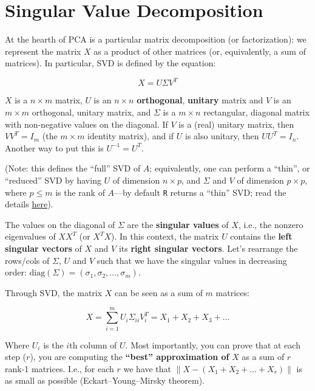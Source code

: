 \documentclass[
  letterpaper,
  DIV=11,
  numbers=noendperiod]{scrreprt}
\begin{document}
\hypertarget{singular-value-decomposition}{%
\section{Singular Value
Decomposition}\label{singular-value-decomposition}}

At the hearth of PCA is a particular matrix decomposition (or
factorization): we represent the matrix \(X\) as a product of other
matrices (or, equivalently, a sum of matrices). In particular, SVD is
defined by the equation:

\[
X = U \Sigma V^T
\]

\(X\) is a \(n \times m\) matrix, \(U\) is an \(n \times n\)
\textbf{orthogonal}, \textbf{unitary} matrix and \(V\) is an
\(m \times m\) orthogonal, unitary matrix, and \(\Sigma\) is a
\(m \times n\) rectangular, diagonal matrix with non-negative values on
the diagonal. If \(V\) is a (real) unitary matrix, then \(VV^T = I_m\)
(the \(m \times m\) identity matrix), and if \(U\) is also unitary, then
\(UU^T = I_n\). Another way to put this is \(U^{-1} = U^T\).

(Note: this defines the ``full'' SVD of \(A\); equivalently, one can
perform a ``thin'', or ``reduced'' SVD by having \(U\) of dimension
\(n \times p\), and \(\Sigma\) and \(V\) of dimension \(p \times p\),
where \(p \leq m\) is the rank of \(A\)---by default \texttt{R} returns
a ``thin'' SVD; read the details
\href{http://www.seas.ucla.edu/~vandenbe/133B/lectures/svd.pdf}{here}).

The values on the diagonal of \(\Sigma\) are the \textbf{singular
values} of \(X\), i.e., the nonzero eigenvalues of \(XX^T\) (or
\(X^T X\)). In this context, the matrix \(U\) contains the \textbf{left
singular vectors} of \(X\) and \(V\) its \textbf{right singular
vectors}. Let's rearrange the rows/cols of \(\Sigma\), \(U\) and \(V\)
such that we have the singular values in decreasing order:
\(\text{diag}(\Sigma) = (\sigma_1, \sigma_2, \ldots, \sigma_m)\).

Through SVD, the matrix \(X\) can be seen as a sum of \(m\) matrices:

\[
X = \sum_{i = 1}^m U_i \Sigma_{ii} V_i^T = X_1 + X_2 + X_3 + \ldots
\]

Where \(U_i\) is the \(i\)th column of \(U\). Most importantly, you can
prove that at each step (\(r\)), you are computing the \textbf{``best''
approximation of} \(X\) as a sum of \(r\) rank-1 matrices. I.e., for
each \(r\) we have that \(\| X - (X_1 + X_2 + \ldots + X_r) \|\) is as
small as possible (Eckart--Young--Mirsky theorem).
\end{document}
